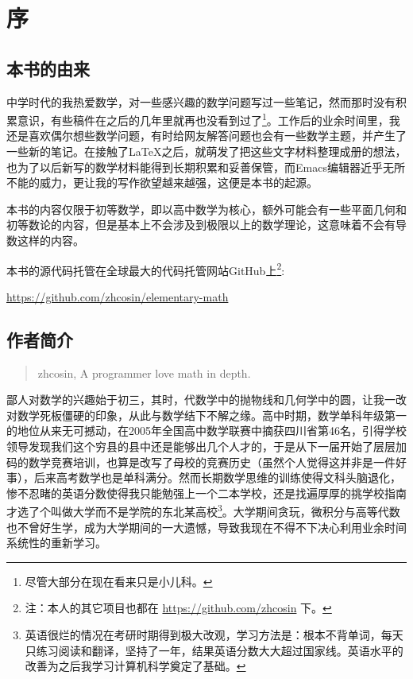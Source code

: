 
\chapter*{序}


\section{本书的由来}

中学时代的我热爱数学，对一些感兴趣的数学问题写过一些笔记，然而那时没有积累意识，有些稿件在之后的几年里就再也没看到过了\footnote{尽管大部分在现在看来只是小儿科。}。工作后的业余时间里，我还是喜欢偶尔想些数学问题，有时给网友解答问题也会有一些数学主题，并产生了一些新的笔记。在接触了LaTeX之后，就萌发了把这些文字材料整理成册的想法，也为了以后新写的数学材料能得到长期积累和妥善保管，而Emacs编辑器近乎无所不能的威力，更让我的写作欲望越来越强，这便是本书的起源。

本书的内容仅限于初等数学，即以高中数学为核心，额外可能会有一些平面几何和初等数论的内容，但是基本上不会涉及到极限以上的数学理论，这意味着不会有导数这样的内容。

本书的源代码托管在全球最大的代码托管网站GitHub上\footnote{注：本人的其它项目也都在 \href{https://github.com/zhcosin}{https://github.com/zhcosin} 下。}:
\begin{center}
\href{https://github.com/zhcosin/elementary-math}{https://github.com/zhcosin/elementary-math}
\end{center}

\section{作者简介}
\begin{quotation}
zhcosin, A programmer love math in depth.
\end{quotation}

鄙人对数学的兴趣始于初三，其时，代数学中的抛物线和几何学中的圆，让我一改对数学死板僵硬的印象，从此与数学结下不解之缘。高中时期，数学单科年级第一的地位从来无可撼动，在2005年全国高中数学联赛中摘获四川省第46名，引得学校领导发现我们这个穷县的县中还是能够出几个人才的，于是从下一届开始了层层加码的数学竞赛培训，也算是改写了母校的竞赛历史（虽然个人觉得这并非是一件好事），后来高考数学也是单科满分。然而长期数学思维的训练使得文科头脑退化，惨不忍睹的英语分数使得我只能勉强上一个二本学校，还是找遍厚厚的挑学校指南才选了个叫做大学而不是学院的东北某高校\footnote{英语很烂的情况在考研时期得到极大改观，学习方法是：根本不背单词，每天只练习阅读和翻译，坚持了一年，结果英语分数大大超过国家线。英语水平的改善为之后我学习计算机科学奠定了基础。}。大学期间贪玩，微积分与高等代数也不曾好生学，成为大学期间的一大遗憾，导致我现在不得不下决心利用业余时间系统性的重新学习。

